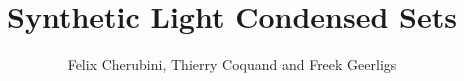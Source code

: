 \documentclass{../util/zariski-small}
\title{Synthetic Light Condensed Sets}
\theoremstyle{break}
\begin{document}
\author{Felix Cherubini, Thierry Coquand and Freek Geerligs}

\maketitle

\newcommand{\Boole}{\mathsf{Boole}}
\newcommand{\Stone}{\mathsf{Stone}}
\newcommand{\Noo}{\N_{\infty}}
\newcommand{\Closed}{\mathsf{Closed}}
\newcommand{\ints}{\mathbb{Z}}





%
%
%
%

\printbibliography
\end{document}

